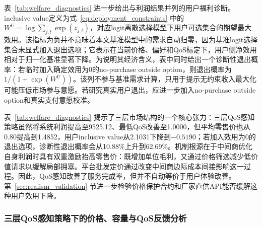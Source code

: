 \documentclass[UTF8,11pt]{ctexart}
\begin{document}
表~\ref{tab:welfare_diagnostics} 进一步给出与利润结果并列的用户福利诊断。inclusive value定义为式~\eqref{eq:deployment_constraints} 中的$W^U=\log\sum_{j,t}\exp(z_{j,t})$，对应logit离散选择模型下用户可选集合的期望最大效用。该指标为负并不意味着本文基准模型中的需求自动归零，因为基准logit选择集合未显式加入退出选项；它表示在当前价格、偏好和QoS标定下，用户侧净效用相对于归一化基准显著下降。为说明其经济含义，表中同时给出一个诊断性退出概率：若临时加入确定效用为0的no-purchase outside option，则退出概率为$1/(1+\exp(W^U))$。该列不参与基准需求计算，只用于提示无约束收入最大化可能压低市场参与意愿。若研究真实用户退出，应进一步加入no-purchase outside option和真实支付意愿校准。

\begin{table}[H]
\centering
\caption{用户福利与服务质量诊断。退出概率为加入效用0退出选项后的诊断值，不参与基准需求计算。}
\label{tab:welfare_diagnostics}
\small
{}
\end{table}

表~\ref{tab:welfare_diagnostics} 揭示了三层市场结构的一个核心张力：三层QoS感知策略虽然将系统利润提高至9525.12、最低QoS改善至1.0000，但平均零售价也从0.80提高到1.4852，用户inclusive value从2.1031下降到$-0.5190$；若加入效用为0的退出选项，诊断性退出概率会从10.88\%上升到62.69\%。机制根源在于中间商优化自身利润时具有双重激励抬高零售价：既增加单位毛利，又通过价格筛选减少低价值请求以缓解局部拥塞。平台批发定价通过改变中间商边际成本间接影响这一过程。因此，QoS感知改善了服务完成率，但并不自动等价于用户体验改善。第~\ref{sec:realism_validation} 节进一步检验价格保护合约和厂家直供API能否缓解这种用户效用下降。

\subsubsection{三层QoS感知策略下的价格、容量与QoS反馈分析}
\label{sec:pricing_capacity_detail}
\end{document}
